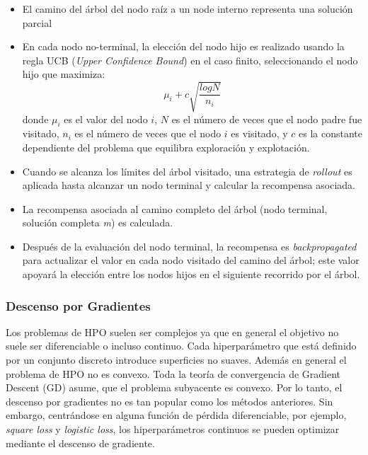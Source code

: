 \begin{itemize}
	\item El camino del árbol del nodo raíz a un node interno representa una solución parcial
	\item  En cada nodo no-terminal, la elección del nodo hijo es realizado usando la regla UCB (\textit{Upper Confidence Bound}) en el caso finito, seleccionando el nodo hijo que maximiza: 
	$$
	 \mu_i + c\sqrt{\frac{logN}{n_i}}
	$$
	donde $\mu_i$  es el valor del nodo $i$, $N$ es el número de veces que el nodo padre fue visitado, $n_i$ es el número de veces que el nodo $i$ es visitado, y $c$ es la constante dependiente del problema que equilibra exploración y explotación.
	\item Cuando se alcanza los límites del árbol visitado, una estrategia de \textit{rollout} es aplicada hasta alcanzar un nodo terminal y calcular la recompensa asociada.
	\item La recompensa asociada al camino completo del árbol (nodo terminal, solución completa \textit{m}) es calculada.
	\item Después de la evaluación del nodo terminal, la recompensa es \textit{backpropagated} para actualizar el valor en cada nodo visitado del camino del árbol; este valor apoyará la elección entre los nodos hijos en el siguiente recorrido por el árbol.
\end{itemize}

\subsubsection{Descenso por Gradientes}


Los problemas de HPO suelen ser complejos ya que en general el objetivo no suele ser diferenciable o incluso continuo. Cada hiperparámetro que está definido por un conjunto discreto introduce superficies no suaves. Además en general el problema de HPO no es convexo. Toda la teoría de convergencia de Gradient Descent  (GD) asume, que el problema subyacente es convexo. Por lo tanto, el descenso por gradientes no es tan popular como los métodos anteriores. Sin embargo, centrándose en alguna función de pérdida diferenciable, por ejemplo, \textit{square loss} y \textit{logistic loss}, los hiperparámetros continuos se pueden optimizar mediante el descenso de gradiente.

